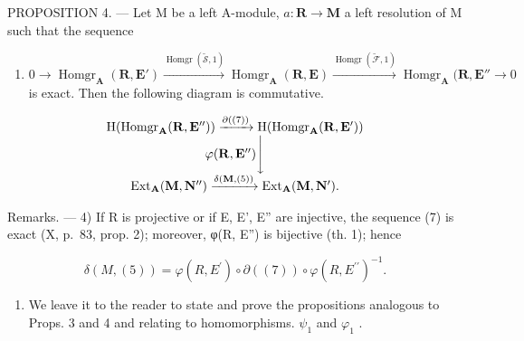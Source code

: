 PROPOSITION 4. --- Let M be a left A-module, \(a: \mathbf{R} \to \mathbf{M}\) a left resolution of M such that the sequence

\begin{enumerate}
\def\labelenumi{(\arabic{enumi})}
\setcounter{enumi}{6}
\tightlist
\item
  \(0 \to \operatorname{Homgr}_{\mathbf{A}}(\mathbf{R}, \mathbf{E}') \xrightarrow{\operatorname{Homgr}(\tilde{\mathcal{S}}, 1)} \operatorname{Homgr}_{\mathbf{A}}(\mathbf{R}, \mathbf{E}) \xrightarrow{\operatorname{Homgr}(\tilde{\mathcal{F}}, 1)} \operatorname{Homgr}_{\mathbf{A}}(\mathbf{R}, \mathbf{E}'' \to 0\) is exact. Then the following diagram is commutative.
\end{enumerate}

\[
\begin{array}{c} \mathrm{H} (\operatorname{Homgr} _ {\mathbf {A}} (\mathbf {R}, \mathbf {E} ^ {\prime \prime})) \xrightarrow {\partial ((7))} \mathrm{H} (\operatorname{Homgr} _ {\mathbf {A}} (\mathbf {R}, \mathbf {E} ^ {\prime})) \\ \varphi (\mathbf {R}, \mathbf {E} ^ {\prime \prime}) \Biggl \downarrow \\ \operatorname{Ext} _ {\mathbf {A}} (\mathbf {M}, \mathbf {N} ^ {\prime \prime}) \xrightarrow {\delta (\mathbf {M} , (5))} \operatorname{Ext} _ {\mathbf {A}} (\mathbf {M}, \mathbf {N} ^ {\prime}). \end{array}
\]

Remarks. --- 4) If R is projective or if E, E', E'' are injective, the sequence (7) is exact (X, p.~83, prop. 2); moreover, φ(R, E'') is bijective (th. 1); hence

\[
\delta (M, (5)) = \varphi (R, E ^ {\prime}) \circ \partial ((7)) \circ \varphi (R, E ^ {\prime \prime}) ^ {- 1}.
\]

\begin{enumerate}
\def\labelenumi{\arabic{enumi})}
\setcounter{enumi}{4}
\tightlist
\item
  We leave it to the reader to state and prove the propositions analogous to Props. 3 and 4 and relating to homomorphisms. \(\psi_{1}\) and \(\varphi_{1}\) .
\end{enumerate}

